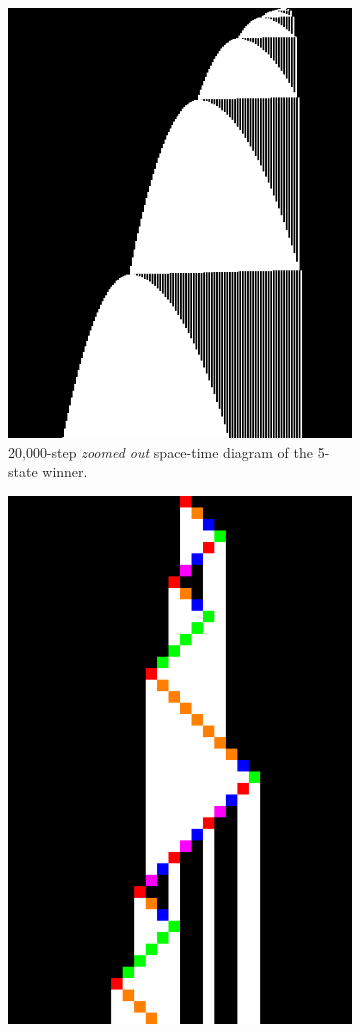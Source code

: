 \begin{figure}[h!]
\begin{subfigure}[t]{0.45\textwidth}
        \vspace{10pt} %
        \includegraphics[width=0.7\linewidth]{figures/space-time-diagrams/bb5_20k.png} %
        \caption{20,000-step \textit{zoomed out} space-time diagram of the 5-state winner.}\label{fig:bb5-diagram-zoomout}
    \end{subfigure}
    \hfill
    \begin{subfigure}[t]{0.45\textwidth}
        \centering
        \vspace{10pt} %
        \includegraphics[width=0.7\linewidth]{figures/space-time-diagrams/bb5.pdf}

\end{subfigure}
\end{figure}
